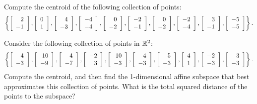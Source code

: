 \documentclass{ximera}
\begin{document}
\begin{exercise}
  Compute the centroid of the following collection of points:
  \begin{equation*}
    \set{
      \startmat{r} 2 \\ -1 \stopmat,
      \startmat{r} 0 \\ 1 \stopmat,
      \startmat{r} 4 \\ -3 \stopmat,
      \startmat{r} -4 \\ -4 \stopmat,
      \startmat{r} 0 \\ -2 \stopmat,
      \startmat{r} -2 \\ -1 \stopmat,
      \startmat{r} 0 \\ -2 \stopmat,
      \startmat{r} -2 \\ -4 \stopmat,
      \startmat{r} 3 \\ -1 \stopmat,
      \startmat{r} -5 \\ -5 \stopmat
    }.
  \end{equation*}
\end{exercise}

\begin{exercise}
  Consider the following collection of points in $\R^2$:
  \begin{equation*}
    \set{
      \startmat{r} 4 \\ -3 \stopmat,
      \startmat{r} 10 \\ -9 \stopmat,
      \startmat{r} 4 \\ -7 \stopmat,
      \startmat{r} -2 \\ 3 \stopmat,
      \startmat{r} 10 \\ -3 \stopmat,
      \startmat{r} 4 \\ -3 \stopmat,
      \startmat{r} 5 \\ -3 \stopmat,
      \startmat{r} 4 \\ 1 \stopmat,
      \startmat{r} -2 \\ -3 \stopmat,
      \startmat{r} 3 \\ -3 \stopmat
    }.
  \end{equation*}
  Compute the centroid, and then find the 1-dimensional affine
  subspace that best approximates this collection of points. What is
  the total squared distance of the points to the subspace?
\end{exercise}
\end{document}
